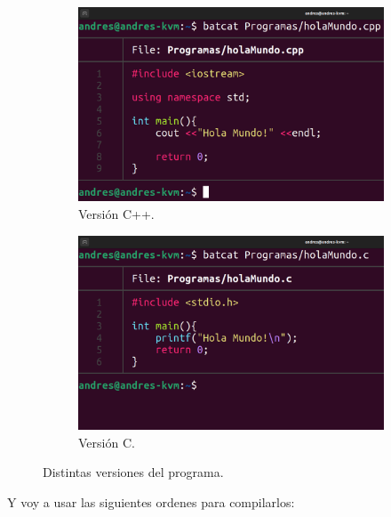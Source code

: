 \documentclass{article}
\begin{document}
\begin{figure}[H]
    \centering
    \begin{subfigure}{0.49\textwidth}
        \centering
        \includegraphics[width=\textwidth]{imagenes/Captura desde 2022-11-15 16-06-21.png}
        \caption{Versión C++.}
    \end{subfigure}
    \hfill
    \begin{subfigure}{0.49\textwidth}
        \centering
        \includegraphics[width=\textwidth]{imagenes/Captura desde 2022-11-15 16-06-14.png}
        \caption{Versión C.}
    \end{subfigure}

    \caption{Distintas versiones del programa.}
\end{figure}



Y voy a usar las siguientes ordenes para compilarlos:

\bigskip
\end{document}
